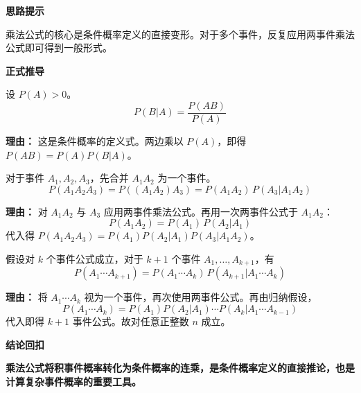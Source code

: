 \begin{proofbox}
	\textbf{\textcolor{CProof}{思路提示}}

	乘法公式的核心是条件概率定义的直接变形。对于多个事件，反复应用两事件乘法公式即可得到一般形式。

	\medskip
	\textbf{\textcolor{CProof}{正式推导}}
	\begin{description}[style=nextline, leftmargin=2.8em, labelsep=0.5em, itemsep=0.55em]
		\item[\textbf{步骤一（条件概率定义）：}] 设 $P(A)>0$。
			\[
				P(B|A) = \frac{P(AB)}{P(A)}
			\]
			\par\textbf{理由：}
			这是条件概率的定义式。两边乘以 $P(A)$，即得 $P(AB)=P(A)P(B|A)$。

		\item[\textbf{步骤二（三事件递推）：}] 对于事件 $A_1,A_2,A_3$，先合并 $A_1A_2$ 为一个事件。
			\[
				P(A_1A_2A_3) = P((A_1A_2)A_3) = P(A_1A_2)\,P(A_3|A_1A_2)
			\]
			\par\textbf{理由：}
			对 $A_1A_2$ 与 $A_3$ 应用两事件乘法公式。再用一次两事件公式于 $A_1A_2$：
			\[
				P(A_1A_2)=P(A_1)\,P(A_2|A_1)
			\]
			代入得 $P(A_1A_2A_3)=P(A_1)P(A_2|A_1)P(A_3|A_1A_2)$。

		\item[\textbf{步骤三（n事件归纳）：}] 假设对 $k$ 个事件公式成立，对于 $k+1$ 个事件 $A_1,\dots,A_{k+1}$，有
			\[
				P(A_1\cdots A_{k+1})=P(A_1\cdots A_k)\,P(A_{k+1}|A_1\cdots A_k)
			\]
			\par\textbf{理由：}
			将 $A_1\cdots A_k$ 视为一个事件，再次使用两事件公式。再由归纳假设，
			\[
				P(A_1\cdots A_k)=P(A_1)P(A_2|A_1)\cdots P(A_k|A_1\cdots A_{k-1})
			\]
			代入即得 $k+1$ 事件公式。故对任意正整数 $n$ 成立。
	\end{description}

	\medskip
	\textbf{\textcolor{CProof}{结论回扣}}

	\textbf{乘法公式将积事件概率转化为条件概率的连乘，是条件概率定义的直接推论，也是计算复杂事件概率的重要工具。}
\end{proofbox}
